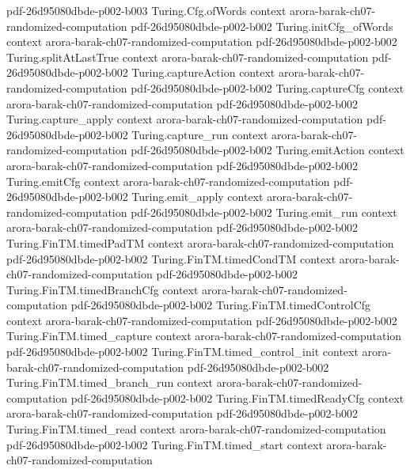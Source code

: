 \begin{theorem}
  {pdf-26d95080dbde-p002-b003}
\proofstep
  {Turing.Cfg.ofWords}
  {context}
  {arora-barak-ch07-randomized-computation}
  {pdf-26d95080dbde-p002-b002}
\proofstep
  {Turing.initCfg_ofWords}
  {context}
  {arora-barak-ch07-randomized-computation}
  {pdf-26d95080dbde-p002-b002}
\proofstep
  {Turing.splitAtLastTrue}
  {context}
  {arora-barak-ch07-randomized-computation}
  {pdf-26d95080dbde-p002-b002}
\proofstep
  {Turing.captureAction}
  {context}
  {arora-barak-ch07-randomized-computation}
  {pdf-26d95080dbde-p002-b002}
\proofstep
  {Turing.captureCfg}
  {context}
  {arora-barak-ch07-randomized-computation}
  {pdf-26d95080dbde-p002-b002}
\proofstep
  {Turing.capture_apply}
  {context}
  {arora-barak-ch07-randomized-computation}
  {pdf-26d95080dbde-p002-b002}
\proofstep
  {Turing.capture_run}
  {context}
  {arora-barak-ch07-randomized-computation}
  {pdf-26d95080dbde-p002-b002}
\proofstep
  {Turing.emitAction}
  {context}
  {arora-barak-ch07-randomized-computation}
  {pdf-26d95080dbde-p002-b002}
\proofstep
  {Turing.emitCfg}
  {context}
  {arora-barak-ch07-randomized-computation}
  {pdf-26d95080dbde-p002-b002}
\proofstep
  {Turing.emit_apply}
  {context}
  {arora-barak-ch07-randomized-computation}
  {pdf-26d95080dbde-p002-b002}
\proofstep
  {Turing.emit_run}
  {context}
  {arora-barak-ch07-randomized-computation}
  {pdf-26d95080dbde-p002-b002}
\proofstep
  {Turing.FinTM.timedPadTM}
  {context}
  {arora-barak-ch07-randomized-computation}
  {pdf-26d95080dbde-p002-b002}
\proofstep
  {Turing.FinTM.timedCondTM}
  {context}
  {arora-barak-ch07-randomized-computation}
  {pdf-26d95080dbde-p002-b002}
\proofstep
  {Turing.FinTM.timedBranchCfg}
  {context}
  {arora-barak-ch07-randomized-computation}
  {pdf-26d95080dbde-p002-b002}
\proofstep
  {Turing.FinTM.timedControlCfg}
  {context}
  {arora-barak-ch07-randomized-computation}
  {pdf-26d95080dbde-p002-b002}
\proofstep
  {Turing.FinTM.timed_capture}
  {context}
  {arora-barak-ch07-randomized-computation}
  {pdf-26d95080dbde-p002-b002}
\proofstep
  {Turing.FinTM.timed_control_init}
  {context}
  {arora-barak-ch07-randomized-computation}
  {pdf-26d95080dbde-p002-b002}
\proofstep
  {Turing.FinTM.timed_branch_run}
  {context}
  {arora-barak-ch07-randomized-computation}
  {pdf-26d95080dbde-p002-b002}
\proofstep
  {Turing.FinTM.timedReadyCfg}
  {context}
  {arora-barak-ch07-randomized-computation}
  {pdf-26d95080dbde-p002-b002}
\proofstep
  {Turing.FinTM.timed_read}
  {context}
  {arora-barak-ch07-randomized-computation}
  {pdf-26d95080dbde-p002-b002}
\proofstep
  {Turing.FinTM.timed_start}
  {context}
  {arora-barak-ch07-randomized-computation}

\end{theorem}
